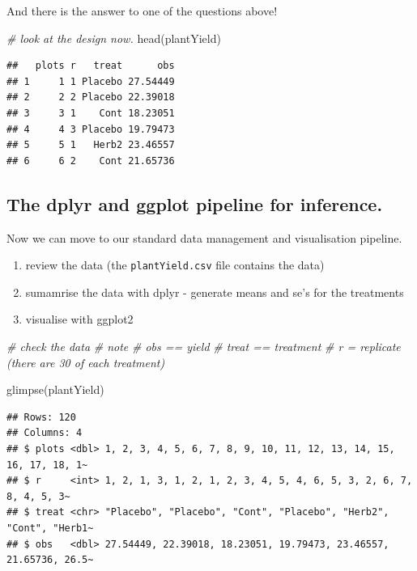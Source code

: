 \documentclass[
]{book}
\newenvironment{Shaded}{\begin{snugshade}}{\end{snugshade}}
\newcommand{\CommentTok}[1]{\textcolor[rgb]{0.56,0.35,0.01}{\textit{#1}}}
\newcommand{\FunctionTok}[1]{\textcolor[rgb]{0.00,0.00,0.00}{#1}}
\newcommand{\NormalTok}[1]{#1}
\providecommand{\tightlist}{%
  \setlength{\itemsep}{0pt}\setlength{\parskip}{0pt}}
\begin{document}
And there is the answer to one of the questions above!

\begin{Shaded}
\begin{Highlighting}[]
\CommentTok{\# look at the design now.}
\FunctionTok{head}\NormalTok{(plantYield)}
\end{Highlighting}
\end{Shaded}

\begin{verbatim}
##   plots r   treat      obs
## 1     1 1 Placebo 27.54449
## 2     2 2 Placebo 22.39018
## 3     3 1    Cont 18.23051
## 4     4 3 Placebo 19.79473
## 5     5 1   Herb2 23.46557
## 6     6 2    Cont 21.65736
\end{verbatim}

\hypertarget{the-dplyr-and-ggplot-pipeline-for-inference.}{%
\subsection{The dplyr and ggplot pipeline for inference.}\label{the-dplyr-and-ggplot-pipeline-for-inference.}}

Now we can move to our standard data management and visualisation pipeline.

\begin{enumerate}
\def\labelenumi{\arabic{enumi}.}
\tightlist
\item
  review the data (the \texttt{plantYield.csv} file contains the data)
\item
  sumamrise the data with dplyr - generate means and se's for the treatments
\item
  visualise with ggplot2
\end{enumerate}

\begin{Shaded}
\begin{Highlighting}[]
\CommentTok{\# check the data}
\CommentTok{\# note}
\CommentTok{\# obs == yield}
\CommentTok{\# treat == treatment}
\CommentTok{\# r = replicate (there are 30 of each treatment)}

\FunctionTok{glimpse}\NormalTok{(plantYield)}
\end{Highlighting}
\end{Shaded}

\begin{verbatim}
## Rows: 120
## Columns: 4
## $ plots <dbl> 1, 2, 3, 4, 5, 6, 7, 8, 9, 10, 11, 12, 13, 14, 15, 16, 17, 18, 1~
## $ r     <int> 1, 2, 1, 3, 1, 2, 1, 2, 3, 4, 5, 4, 6, 5, 3, 2, 6, 7, 8, 4, 5, 3~
## $ treat <chr> "Placebo", "Placebo", "Cont", "Placebo", "Herb2", "Cont", "Herb1~
## $ obs   <dbl> 27.54449, 22.39018, 18.23051, 19.79473, 23.46557, 21.65736, 26.5~
\end{verbatim}
\end{document}
